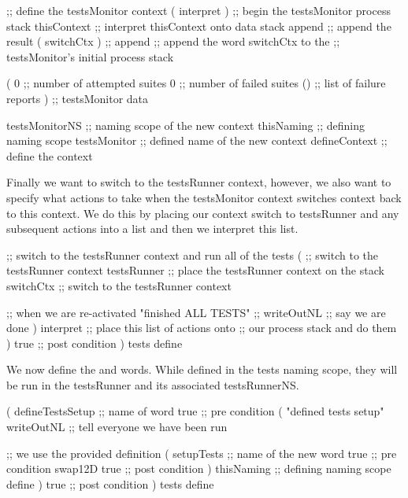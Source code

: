     ;; define the testsMonitor context
    ( interpret )   ;; begin the testsMonitor process stack
    thisContext     ;; interpret thisContext onto data stack
    append          ;; append the result
    ( switchCtx )   ;;
    append          ;; append the word switchCtx to the
                    ;; testsMonitor's initial process stack
  
    (
      0             ;; number of attempted suites
      0             ;; number of failed suites
      ()            ;; list of failure reports
    )               ;; testsMonitor data
  
    testsMonitorNS  ;; naming scope of the new context
    thisNaming      ;; defining naming scope
    testsMonitor    ;; defined name of the new context
    defineContext   ;; define the context
\stopJoylolCode

Finally we want to switch to the testsRunner context, however, we also 
want to specify what actions to take when the testsMonitor context 
switches context back to this context. We do this by placing our context 
switch to testsRunner and any subsequent actions into a list and then we 
interpret this list. 

\startJoylolCode
    ;; switch to the testsRunner context and run all of the tests
    (
      ;; switch to the testsRunner context
      testsRunner ;; place the testsRunner context on the stack
      switchCtx   ;; switch to the testsRunner context
    
      ;; when we are re-activated
      "finished ALL TESTS"  ;;
      writeOutNL            ;; say we are done
    )
    interpret     ;; place this list of actions onto
                  ;; our process stack and do them
  )
  { true }        ;; post condition
)
tests
define
\stopJoylolCode

We now define the  and  
words. While defined in the tests naming scope, they will be run in the 
testsRunner and its associated testsRunnerNS. 

\startJoylolCode
( 
  defineTestsSetup ;; name of word
  { true }         ;; pre condition
  (
    "defined tests setup"
    writeOutNL     ;; tell everyone we have been run
  
                   ;; we use the provided definition
    (
      setupTests   ;; name of the new word
      { true }     ;; pre condition
      swap12D
      { true }     ;; post condition
    )
    thisNaming     ;; defining naming scope
    define
  )
  { true }         ;; post condition
)
tests
define
\stopJoylolCode

